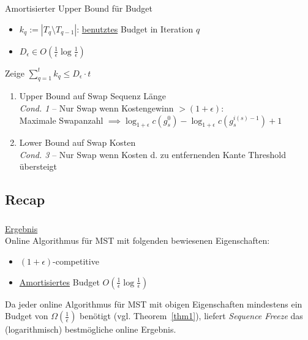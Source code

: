\begin{frame}
    \frametitle{\insertsubsection}
    Amortisierter Upper Bound für Budget
    \vspace{.5em}
    \begin{itemize}
        \itemsep\setlength{.5em}
        \item $k_q := |T_q \setminus T_{q-1}|$: \underline{benutztes} Budget in Iteration $q$
        \item $D_\epsilon \in O(\frac{1}{\epsilon}\log\frac{1}{\epsilon})$
    \end{itemize}
    \vspace{.5em}
    \begin{block}{Zeige $\sum_{q=1}^t k_q \leq D_\epsilon \cdot t$}
        \vspace{.5em}
        \begin{enumerate}
            \itemsep\setlength{.8em}
            \item Upper Bound auf Swap Sequenz Länge\\
            \emph{Cond. 1} -- Nur Swap wenn Kostengewinn $> (1+\epsilon)$:\\Maximale Swapanzahl $\implies \log_{1+\epsilon}c(g_s^0) - \log_{1+\epsilon}c(g_s^{i(s)-1}) + 1$
            \item Lower Bound auf Swap Kosten\\
            \emph{Cond. 3} -- Nur Swap wenn Kosten d. zu entfernenden Kante Threshold übersteigt
        \end{enumerate}
        \vspace{.1em}
    \end{block}
\end{frame}

\subsection{Recap}
\begin{frame}
    \frametitle{\insertsection}
    \underline{Ergebnis}\\
    \vspace{1em}
    Online Algorithmus für MST mit folgenden bewiesenen Eigenschaften:\\
    \vspace{1em}
    \begin{itemize}
        \itemsep\setlength{.8em}
        \item $(1+\epsilon)$-competitive
        \item \underline{Amortisiertes} Budget $O(\frac{1}{\epsilon}\log\frac{1}{\epsilon})$
    \end{itemize}
    \vspace{1em}
    Da jeder online Algorithmus für MST mit obigen Eigenschaften mindestens ein Budget von $\Omega(\frac{1}{\epsilon})$ benötigt (vgl. Theorem~\ref{thm1}), liefert \emph{Sequence Freeze} das (logarithmisch) bestmögliche online Ergebnis.
\end{frame}